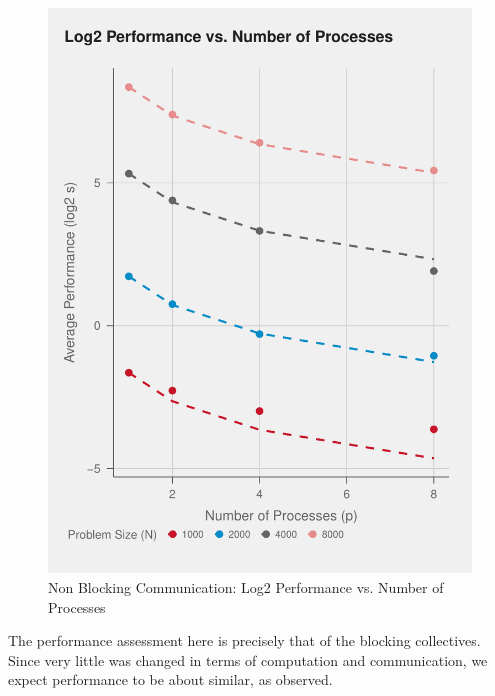 \documentclass{article}
\begin{document}
\begin{figure}[H]
   \centering
   \includegraphics[scale=0.4]{../part2/out/np-6.pdf} 
   \caption{Non Blocking Communication: Log2 Performance vs. Number of Processes}
\end{figure}
\noindent The performance assessment here is precisely that of the blocking collectives. Since 
very little was changed in terms of computation and communication, we expect performance 
to be about similar, as observed.
\end{document}
